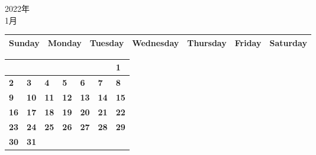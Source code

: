 \documentclass[a4paper,landscape]{jsarticle}
\newcommand{\dig}{\hspace{29mm}}
\newcommand{\tdig}{\hspace{27mm}}
\newcommand{\LBF}{\LARGE\textbf}
\begin{document}
\pagestyle{empty} %

\begin{center}
	\LARGE 2022年\\ %
	\LARGE 1月%
\end{center}


\begingroup
\renewcommand{\arraystretch}{1.4}
\begin{tabular}{|>{\centering\arraybackslash}p{32mm}|>{\centering\arraybackslash}p{32mm}|>{\centering\arraybackslash}p{32mm}|>{\centering\arraybackslash}p{32mm}|>{\centering\arraybackslash}p{32mm}|>{\centering\arraybackslash}p{32mm}|>{\centering\arraybackslash}p{32mm}|}
\hline
\large Sunday&\large Monday &\large Tuesday&\large Wednesday&\large Thursday&\large Friday&\large Saturday\\ 
\hline
\end{tabular}
\endgroup

\begingroup
\renewcommand{\arraystretch}{4}
\begin{tabular}{|p{32mm}|p{32mm}|p{32mm}|p{32mm}|p{32mm}|p{32mm}|p{32mm}|}
\hline
&&&&&&\raisebox{30pt} {\dig\LBF{1}}\\
\hline
\raisebox{30pt} {\dig\LBF{2}}&\raisebox{30pt} {\dig\LBF{3}}&\raisebox{30pt} {\dig\LBF{4}}&\raisebox{30pt} {\dig\LBF{5}}&\raisebox{30pt} {\dig\LBF{6}}&\raisebox{30pt} {\dig\LBF{7}}&\raisebox{30pt} {\dig\LBF{8}}\\
\hline
\raisebox{30pt} {\dig\LBF{9}}&\raisebox{30pt} {\tdig\LBF{10}}&\raisebox{30pt} {\tdig\LBF{11}}&\raisebox{30pt} {\tdig\LBF{12}}&\raisebox{30pt} {\tdig\LBF{13}}&\raisebox{30pt} {\tdig\LBF{14}}&\raisebox{30pt} {\tdig\LBF{15}}\\
\hline
\raisebox{30pt} {\tdig\LBF{16}}&\raisebox{30pt} {\tdig\LBF{17}}&\raisebox{30pt} {\tdig\LBF{18}}&\raisebox{30pt} {\tdig\LBF{19}}&\raisebox{30pt} {\tdig\LBF{20}}&\raisebox{30pt} {\tdig\LBF{21}}&\raisebox{30pt} {\tdig\LBF{22}}\\
\hline
\raisebox{30pt} {\tdig\LBF{23}}&\raisebox{30pt} {\tdig\LBF{24}}&\raisebox{30pt} {\tdig\LBF{25}}&\raisebox{30pt} {\tdig\LBF{26}}&\raisebox{30pt} {\tdig\LBF{27}}&\raisebox{30pt} {\tdig\LBF{28}}&\raisebox{30pt} {\tdig\LBF{29}}\\
\hline
\raisebox{30pt} {\tdig\LBF{30}}&\raisebox{30pt} {\tdig\LBF{31}}&&&&&\\
\hline
\end{tabular}
\endgroup
\end{document}
